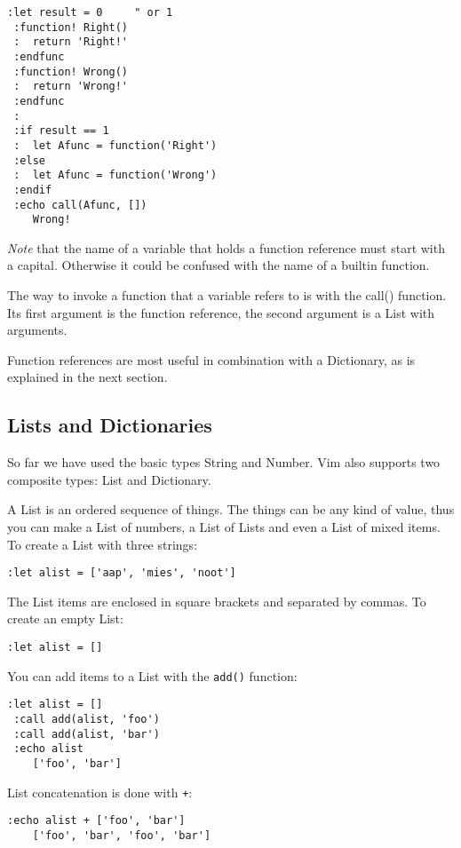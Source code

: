 \begin{Verbatim}[samepage=true]
 :let result = 0     " or 1
 :function! Right()
 :  return 'Right!'
 :endfunc
 :function! Wrong()
 :  return 'Wrong!'
 :endfunc
 :
 :if result == 1
 :  let Afunc = function('Right')
 :else
 :  let Afunc = function('Wrong')
 :endif
 :echo call(Afunc, [])
    Wrong!
\end{Verbatim}

\emph{Note} that the name of a variable that holds a function reference must start with a capital.
Otherwise it could be confused with the name of a builtin function.

The way to invoke a function that a variable refers to is with the call() function.
Its first argument is the function reference, the second argument is a List with arguments.

Function references are most useful in combination with a Dictionary, as is explained in the next section.
\subsection{Lists and Dictionaries}
\label{Lists and Dictionaries}
So far we have used the basic types String and Number.
Vim also supports two composite types: List and Dictionary.

A List is an ordered sequence of things.
The things can be any kind of value, thus you can make a List of numbers, a List of Lists and even a List of mixed items.
To create a List with three strings:

\begin{Verbatim}[samepage=true]
 :let alist = ['aap', 'mies', 'noot']
\end{Verbatim}

The List items are enclosed in square brackets and separated by commas.
To create an empty List:

\begin{Verbatim}[samepage=true]
 :let alist = []
\end{Verbatim}

You can add items to a List with the \texttt{add()} function:

\begin{Verbatim}[samepage=true]
 :let alist = []
 :call add(alist, 'foo')
 :call add(alist, 'bar')
 :echo alist
    ['foo', 'bar']
\end{Verbatim}

List concatenation is done with \texttt{+}:

\begin{Verbatim}[samepage=true]
 :echo alist + ['foo', 'bar']
    ['foo', 'bar', 'foo', 'bar']
\end{Verbatim}

